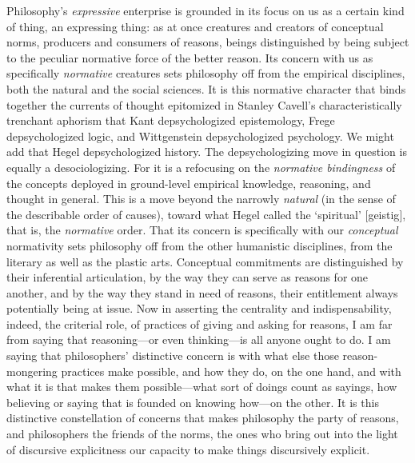 Philosophy's \emph{expressive} enterprise is grounded in its focus on us
as a certain kind of thing, an expressing thing: as at once creatures
and creators of conceptual norms, producers and consumers of reasons,
beings distinguished by being subject to the peculiar normative force of
the better reason. Its concern with us as specifically \emph{normative}
creatures sets philosophy off from the empirical disciplines, both the
natural and the social sciences. It is this normative character that
binds together the currents of thought epitomized in Stanley Cavell's
characteristically trenchant aphorism that Kant depsychologized
epistemology, Frege depsychologized logic, and Wittgenstein
depsychologized psychology. We might add that Hegel depsychologized
history. The depsychologizing move in question is equally a
desociologizing. For it is a refocusing on the \emph{normative
bindingness} of the concepts deployed in ground-level empirical
knowledge, reasoning, and thought in general. This is a move beyond the
narrowly \emph{natural} (in the sense of the describable order of
causes), toward what Hegel called the `spiritual' {[}geistig{]}, that
is, the \emph{normative} order. That its concern is specifically with
our \emph{conceptual} normativity sets philosophy off from the other
humanistic disciplines, from the literary as well as the plastic arts.
Conceptual commitments are distinguished by their inferential
articulation, by the way they can serve as reasons for one another, and
by the way they stand in need of reasons, their entitlement always
potentially being at issue. Now in asserting the centrality and
indispensability, indeed, the criterial role, of practices of giving and
asking for reasons, I am far from saying that reasoning---or even
thinking---is all anyone ought to do. I am saying that philosophers'
distinctive concern is with what else those reason-mongering practices
make possible, and how they do, on the one hand, and with what it is
that makes them possible---what sort of doings count as sayings, how
believing or saying that is founded on knowing how---on the other. It is
this distinctive constellation of concerns that makes philosophy the
party of reasons, and philosophers the friends of the norms, the ones
who bring out into the light of discursive explicitness our capacity to
make things discursively explicit.
